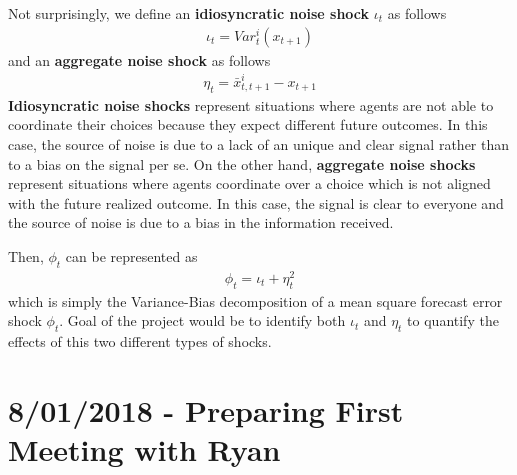 \documentclass{article}
\begin{document}
{Not surprisingly, we define an \textbf{idiosyncratic noise shock} $\iota_t$ as follows
\begin{eqnarray}\label{eq:idio_shock}
\iota_t = Var^i_t(x_{t+1})
\end{eqnarray}
and an \textbf{aggregate noise shock} as follows
\begin{eqnarray}\label{eq:aggre_shock}
\eta_t = \bar{x}_{t,t+1}^i - x_{t+1}
\end{eqnarray}
\textbf{Idiosyncratic noise shocks} represent situations where agents are not able to coordinate their choices because they expect different future outcomes. In this case, the source of noise is due to a lack of an unique and clear signal rather than to a bias on the signal per se. On the other hand, \textbf{aggregate noise shocks} represent situations where agents coordinate over a choice which is not aligned with the future realized outcome. In this case, the signal is clear to everyone and the source of noise is due to a bias in the information received.

Then, $\phi_t$ can be represented as
\begin{eqnarray}\label{eq:bias_var_dec}
\phi_t = \iota_t + \eta_t^2
\end{eqnarray}
which is simply the Variance-Bias decomposition of a mean square forecast error shock $\phi_t$. Goal of the project would be to identify both $\iota_t$ and $\eta_t$ to quantify the effects of this two different types of shocks.

\section*{8/01/2018 - Preparing First Meeting with Ryan}









}
\end{document}
